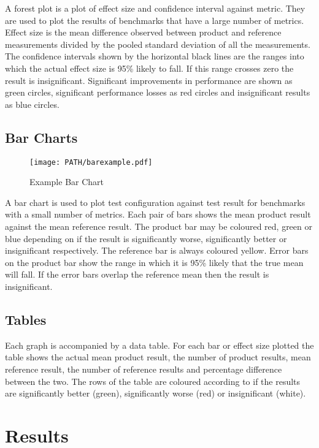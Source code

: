 \documentclass[a4paper, 12pt, notitlepage]{report}
\begin{document}
A forest plot is a plot of effect size and confidence interval against metric.
They are used to plot the results of benchmarks that have a large number of 
metrics. Effect size is the mean difference observed between product and 
reference measurements divided by the pooled standard deviation of all the 
measurements. The confidence intervals shown by the horizontal black lines 
are the ranges into which the actual effect size is 95\% likely to fall.  
If this range crosses zero the result is insignificant. Significant 
improvements in performance are shown as green circles, significant 
performance losses as red circles and insignificant results as blue circles. 

\section{Bar Charts}

\begin{figure}[h]
\centering
\texttt{[image: PATH/barexample.pdf]}
\caption{Example Bar Chart}
\end{figure}

A bar chart is used to plot test configuration against test result for 
benchmarks with a small number of metrics. Each pair of bars shows the
mean product result against the mean reference result. The product bar 
may be coloured red, green or blue depending on if the result is 
significantly worse, significantly better or insignificant respectively.
The reference bar is always coloured yellow. Error bars on the product
bar show the range in which it is 95\% likely that the true mean will fall.
If the error bars overlap the reference mean then the result is insignificant.

\section{Tables}

Each graph is accompanied by a data table. For each bar or effect size plotted
the table shows the actual mean product result, the number of product results,
mean reference result, the number of reference results and 
percentage difference between the two. The rows of the table are coloured
according to if the results are significantly better (green), significantly
 worse (red) or insignificant (white).

\newpage

\chapter {Results}


\end{document}
